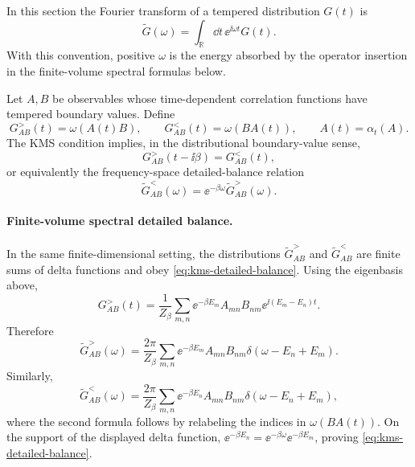 In this section the Fourier transform of a tempered distribution \(G(t)\) is
\begin{equation}
  \widetilde G(\omega)
  =
  \int_{\mathbb R}\dd t\,\ee^{\ii\omega t}G(t).
  \label{eq:thermal-fourier-convention}
\end{equation}
With this convention, positive \(\omega\) is the energy absorbed by the
operator insertion in the finite-volume spectral formulas below.

Let \(A,B\) be observables whose time-dependent correlation functions have
tempered boundary values.  Define
\begin{equation}
  G_{AB}^{>}(t)=\omega(A(t)B),
  \qquad
  G_{AB}^{<}(t)=\omega(BA(t)),
  \qquad
  A(t)=\alpha_t(A).
  \label{eq:thermal-greater-lesser-definitions}
\end{equation}
The KMS condition implies, in the distributional boundary-value sense,
\begin{equation}
  G_{AB}^{>}(t-\ii\beta)=G_{AB}^{<}(t),
  \label{eq:kms-greater-lesser-boundary}
\end{equation}
or equivalently the frequency-space detailed-balance relation
\begin{equation}
  \widetilde G_{AB}^{<}(\omega)
  =
  \ee^{-\beta\omega}\widetilde G_{AB}^{>}(\omega).
  \label{eq:kms-detailed-balance}
\end{equation}

\paragraph{Finite-volume spectral detailed balance.}
In the same finite-dimensional setting, the distributions
\(\widetilde G^{>}_{AB}\) and \(\widetilde G^{<}_{AB}\) are finite sums of
delta functions and obey \eqref{eq:kms-detailed-balance}.  Using the
eigenbasis above,
\[
  G_{AB}^{>}(t)
  =
  \frac1{Z_\beta}
  \sum_{m,n}
  \ee^{-\beta E_m}A_{mn}B_{nm}
  \ee^{\ii(E_m-E_n)t}.
\]
Therefore
\begin{equation}
  \widetilde G_{AB}^{>}(\omega)
  =
  \frac{2\pi}{Z_\beta}
  \sum_{m,n}
  \ee^{-\beta E_m}A_{mn}B_{nm}
  \delta(\omega-E_n+E_m).
  \label{eq:finite-volume-greater-spectral}
\end{equation}
Similarly,
\begin{equation}
  \widetilde G_{AB}^{<}(\omega)
  =
  \frac{2\pi}{Z_\beta}
  \sum_{m,n}
  \ee^{-\beta E_n}A_{mn}B_{nm}
  \delta(\omega-E_n+E_m),
  \label{eq:finite-volume-lesser-spectral}
\end{equation}
where the second formula follows by relabeling the indices in
\(\omega(BA(t))\).  On the support of the displayed delta function,
\(\ee^{-\beta E_n}=\ee^{-\beta\omega}\ee^{-\beta E_m}\), proving
\eqref{eq:kms-detailed-balance}.

